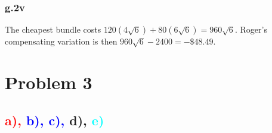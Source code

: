 \documentclass[12pt,letterpaper]{article}
\theoremstyle{definition}
\begin{document}
\subsubsection*{g.2v}

The cheapest bundle costs $120(4\sqrt{6}) + 80(6\sqrt{6}) = 960\sqrt{6}$.
Roger's compensating variation is then $960\sqrt{6} - 2400 = -\$48.49$.

\section*{Problem 3}

\subsection*{\textcolor{red}{a),} \textcolor{blue}{b), c),} d), \textcolor{cyan}{e)}}
\end{document}
